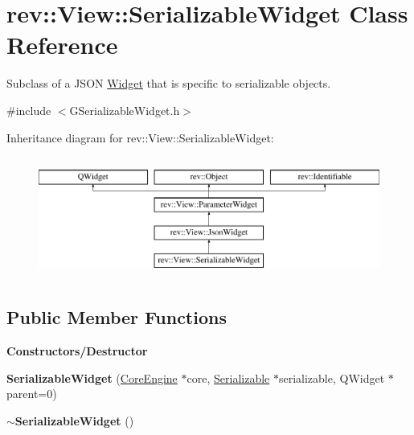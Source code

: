 \hypertarget{classrev_1_1_view_1_1_serializable_widget}{}\section{rev\+::View\+::Serializable\+Widget Class Reference}
\label{classrev_1_1_view_1_1_serializable_widget}


Subclass of a J\+S\+ON \mbox{\hyperlink{class_widget}{Widget}} that is specific to serializable objects.  




{\ttfamily \#include $<$G\+Serializable\+Widget.\+h$>$}

Inheritance diagram for rev\+::View\+::Serializable\+Widget\+:\begin{figure}[H]
\begin{center}
\leavevmode
\includegraphics[height=4.000000cm]{classrev_1_1_view_1_1_serializable_widget}
\end{center}
\end{figure}
\subsection*{Public Member Functions}
\begin{Indent}\textbf{ Constructors/\+Destructor}\par
\begin{DoxyCompactItemize}
\item 
\mbox{\label{classrev_1_1_view_1_1_serializable_widget_a79fa3fabc535283df6375fcdc4ab8c2e}} 
{\bfseries Serializable\+Widget} (\mbox{\hyperlink{classrev_1_1_core_engine}{Core\+Engine}} $\ast$core, \mbox{\hyperlink{classrev_1_1_serializable}{Serializable}} $\ast$serializable, Q\+Widget $\ast$parent=0)
\item 
\mbox{\label{classrev_1_1_view_1_1_serializable_widget_a4ca33a0464f8fcc6978b008da9b4d149}} 
{\bfseries $\sim$\+Serializable\+Widget} ()
\end{DoxyCompactItemize}
\end{Indent}
